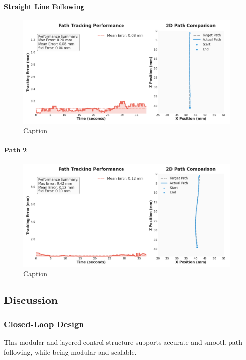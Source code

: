 \paragraph*{Straight Line Following}
\begin{figure} [H]
    \centering
    \includegraphics[width=\linewidth]{images/pathfollowing/ILOS/straight_250704_164227.png}
    \caption{Caption}
    \label{fig:enter-label}
\end{figure}

\paragraph*{Path 2}
\begin{figure} [H]
    \centering
    \includegraphics[width=\linewidth]{images/pathfollowing/ILOS/twocurves_250704_153907.png}
    \caption{Caption}
    \label{fig:enter-label}
\end{figure}

\subsection{Discussion}

\subsubsection{Closed-Loop Design}
This modular and layered control structure supports accurate and smooth path following, while being modular and scalable. 

